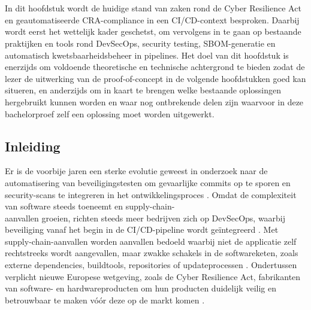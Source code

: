 \chapter{}%
\label{ch:stand-van-zaken}


In dit hoofdstuk wordt de huidige stand van zaken rond de Cyber Resilience Act en geautomatiseerde CRA-compliance in een CI/CD-context besproken. Daarbij wordt eerst het wettelijk kader geschetst, om vervolgens in te gaan op bestaande praktijken en tools rond DevSecOps, security testing, SBOM-generatie en automatisch kwetsbaarheidsbeheer in pipelines. Het doel van dit hoofdstuk is enerzijds om voldoende theoretische en technische achtergrond te bieden zodat de lezer de uitwerking van de proof-of-concept in de volgende hoofdstukken goed kan situeren, en anderzijds om in kaart te brengen welke bestaande oplossingen hergebruikt kunnen worden en waar nog ontbrekende delen zijn waarvoor in deze bachelorproef zelf een oplossing moet worden uitgewerkt.

\section{Inleiding}

Er is de voorbije jaren een sterke evolutie geweest in onderzoek naar de automatisering van beveiligingstesten om gevaarlijke commits op te sporen en security-scans te integreren in het ontwikkelingsproces \autocite{Takahashi2025}. Omdat de complexiteit van software steeds toeneemt en supply-chain-\\aanvallen groeien, richten steeds meer bedrijven zich op DevSecOps, waarbij beveiliging vanaf het begin in de CI/CD-pipeline wordt geïntegreerd \autocite{Takahashi2025}. Met supply-chain-aanvallen worden aanvallen bedoeld waarbij niet de applicatie zelf rechtstreeks wordt aangevallen, maar zwakke schakels in de softwareketen, zoals externe dependencies, buildtools, repositories of updateprocessen \autocite{OWASPSupplyChain,LegitSupplyChain}. Ondertussen verplicht nieuwe Europese wetgeving, zoals de Cyber Resilience Act, fabrikanten van software- en hardwareproducten om hun producten duidelijk veilig en betrouwbaar te maken vóór deze op de markt komen \autocite{EU_CRA}. 

